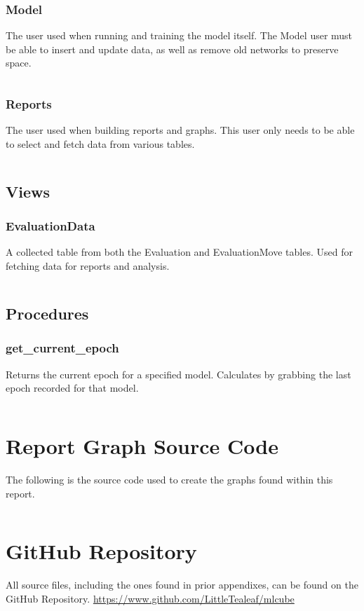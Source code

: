 \documentclass[12pt]{article}
\begin{document}
\subsubsection{Model}

The user used when running and training the model itself. The Model user must be able to insert and update data, as well as remove old networks to preserve space.

\inputminted{SQL}{../../sql/users/model.sql}

\subsubsection{Reports}

The user used when building reports and graphs. This user only needs to be able to select and fetch data from various tables.

\inputminted{SQL}{../../sql/users/reports.sql}

\subsection{Views}

\subsubsection{EvaluationData}

A collected table from both the Evaluation and EvaluationMove tables. Used for fetching data for reports and analysis.

\inputminted{SQL}{../../sql/views/EvaluationData.sql}

\subsection{Procedures}

\subsubsection{get\_current\_epoch}

Returns the current epoch for a specified model. Calculates by grabbing the last epoch recorded for that model.

\inputminted{SQL}{../../sql/procedures/get_current_epoch.sql}

\newpage

\section{Report Graph Source Code}

The following is the source code used to create the graphs found within this report.

\inputminted{R}{../scripts/SER-300-Report.R}

\newpage

\section{GitHub Repository}

All source files, including the ones found in prior appendixes, can be found on the GitHub Repository. \url{https://www.github.com/LittleTealeaf/mlcube}
\end{document}
